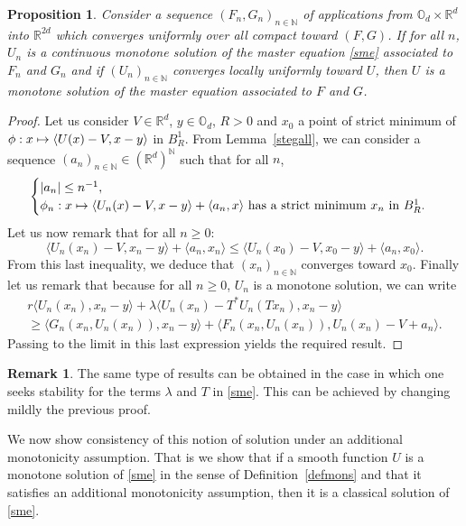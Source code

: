 \documentclass[JEP,XML,SOM,Unicode,NoEqCountersInSection,published]{cedram}
\newcommand\mto{\mathchoice{\longmapsto}{\mapsto}{\mapsto}{\mapsto}}
\newtheorem{Prop}{Proposition}[section]
\theoremstyle{definition}
\newtheorem{Rem}{Remark}[section]
\begin{document}
\begin{Prop}\label{stabs}
Consider a sequence $(F_n,G_n)_{n \in \mathbb{N}}$ of applications from $\mathbb{O}_d\times \mathbb{R}^d$ into $\mathbb{R}^{2d}$ which converges uniformly over all compact toward $(F,G)$. If for all $n$, $U_n$ is a continuous monotone solution of the master equation \eqref{sme} associated to $F_n$ and $G_n$ and if $(U_n)_{n \in \mathbb{N}}$ converges locally uniformly toward $U$, then $U$ is a monotone solution of the master equation associated to $F$ and $G$.
\end{Prop}
\begin{proof}
Let us consider $V \in \mathbb{R}^d$, $y \in \mathbb{O}_d$, $R>0$ and $x_0$ a point of strict minimum of $\phi: x \mto \langle U(x)-V, x-y\rangle$ in $B^1_R$. From Lemma~\ref{stegall}, we can consider a sequence $(a_n)_{n \in \mathbb{N}} \in (\mathbb{R}^d)^{\mathbb{N}}$ such that for all $n$,
\begin{equation*}
\begin{cases}
|a_n| \leq n^{-1},\\
\phi_n: x \mto \langle U_n(x)-V, x-y\rangle+\langle a_n,x\rangle \text{ has a strict minimum $x_n$ in }B^1_R.
\end{cases}
\end{equation*}
Let us now remark that for all $n \geq 0$:
\begin{equation*}
\langle U_n(x_n)- V, x_n-y\rangle+\langle a_n, x_n\rangle \leq \langle U_n(x_0)-V, x_0-y\rangle+\langle a_n,x_0\rangle.
\end{equation*}
From this last inequality, we deduce that $(x_n)_{n \in \mathbb{N}}$ converges toward $x_0$. Finally let us remark that because for all $n \geq 0$, $U_n$ is a monotone solution, we can write
\begin{multline*}
r\langle U_n(x_n), x_n-y\rangle + \lambda \langle U_n(x_n)-T^*U_n(Tx_n),x_n-y \rangle \\
\geq
 \langle G_n(x_n, U_n(x_n)), x_n-y\rangle+\langle F_n(x_n,U_n(x_n)), U_n(x_n)-V+a_n\rangle.
\end{multline*}
Passing to the limit in this last expression yields the required result.
\end{proof}
\begin{Rem}
The same type of results can be obtained in the case in which one seeks stability for the terms $\lambda$ and $T$ in \eqref{sme}. This can be achieved by changing mildly the previous proof.
\end{Rem}
We now show consistency of this notion of solution under an additional monotonicity assumption. That is we show that if a smooth function $U$ is a monotone solution of \eqref{sme} in the sense of Definition~\ref{defmons} and that it satisfies an additional monotonicity assumption, then it is a classical solution of \eqref{sme}.
\end{document}
